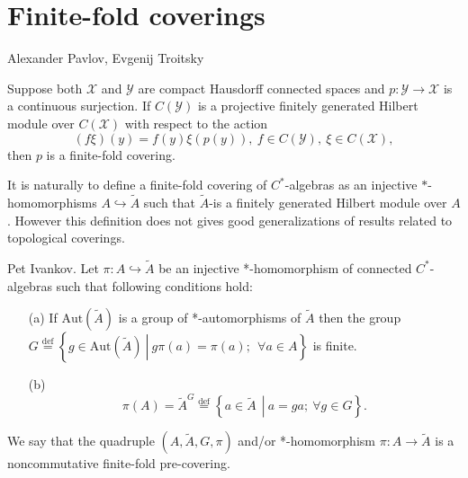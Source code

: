 \documentclass{beamer}
\theoremstyle{plain}
\newcommand{\be}{\begin{equation}}
\newcommand{\ee}{\end{equation}}
\newcommand{\Aut}{\mathrm{Aut}}
\newcommand{\bydef}{\stackrel{\mathrm{def}}{=}}
\newcommand{\hookto}{\hookrightarrow}        %
\begin{document}
\section{Finite-fold coverings}
\begin{frame}
	
	\alert{Alexander Pavlov, Evgenij Troitsky}
	\begin{theorem}
		Suppose both $\mathcal X$ and $\mathcal Y$ are compact Hausdorff connected spaces and $p :\mathcal  Y \to \mathcal X$
		is a continuous surjection. If $C(\mathcal Y )$ is a projective finitely generated Hilbert module over
		$C(\mathcal X)$ with respect to the action
		\begin{equation*}
			(f\xi)(y) = f(y)\xi(p(y)), ~ f \in  C(\mathcal Y ), ~ \xi \in  C(\mathcal X),
		\end{equation*}
		then $p$ is a finite-fold  covering.
	\end{theorem}
	It is naturally to define a finite-fold covering of $C^*$-algebras as an injective $*$-homomorphisms $A\hookto \widetilde A$ such that $ \widetilde A$-is a finitely generated Hilbert module over
	$A$. However this definition does not gives good generalizations of results  related to topological coverings.
	
\end{frame}
\begin{frame}
	\begin{definition}\label{pre_defn} \alert{Pet Ivankov}.
		Let $\pi: A \hookto \widetilde{A}$ be an injective *-homomorphism of connected  $C^*$-algebras such that following conditions hold:
		\begin{enumerate}
			\item[(a)] If $\Aut\left(\widetilde{A} \right)$ is a group of *-automorphisms of $\widetilde{A}$ then the group  
			$
			G \bydef \left\{ \left.g \in \Aut\left(\widetilde{A} \right)~\right|~ g\pi\left( a\right)  = \pi\left( a\right) ;~~\forall a \in A\right\}
			$
			is finite.
			\item[(b)] 	\be\label{cond_b_eqn}
			\pi\left( 	A\right)  = \widetilde{A}^G\stackrel{\text{def}}{=}\left\{\left.a\in \widetilde{A}~~\right|~ a = g a;~ \forall g \in G\right\}.\ee
		\end{enumerate}
		We say that the quadruple $\left(A, \widetilde{A}, G, \pi \right)$ and/or *-homomorphism $\pi: A \to \widetilde{A}$   is a \alert{noncommutative finite-fold  pre-covering}. 
	\end{definition}
	
\end{frame}
\end{document}

